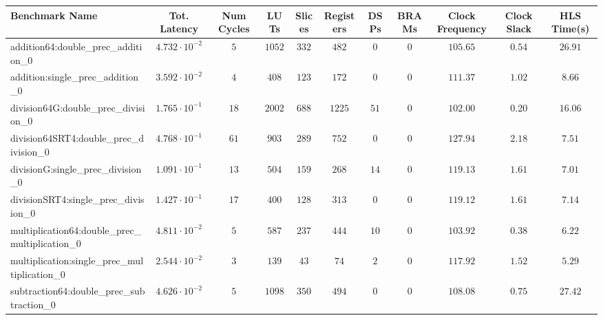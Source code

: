 \begin{tabular}{|l|c|c|c|c|c|c|c|c|c|c|}
\hline
Benchmark Name                                   & Tot. Latency            & Num Cycles & LUTs     & Slices   & Registers & DSPs   & BRAMs & Clock Frequency & Clock Slack & HLS Time(s) \\
\hline
addition64:double\_prec\_addition\_0             & $ 4.732 \cdot 10^{-2} $ & $ 5      $ & $ 1052 $ & $ 332  $ & $ 482   $ & $ 0  $ & $ 0 $ & $ 105.65      $ & $ 0.54    $ & $ 26.91   $ \\
addition:single\_prec\_addition\_0               & $ 3.592 \cdot 10^{-2} $ & $ 4      $ & $ 408  $ & $ 123  $ & $ 172   $ & $ 0  $ & $ 0 $ & $ 111.37      $ & $ 1.02    $ & $ 8.66    $ \\
division64G:double\_prec\_division\_0            & $ 1.765 \cdot 10^{-1} $ & $ 18     $ & $ 2002 $ & $ 688  $ & $ 1225  $ & $ 51 $ & $ 0 $ & $ 102.00      $ & $ 0.20    $ & $ 16.06   $ \\
division64SRT4:double\_prec\_division\_0         & $ 4.768 \cdot 10^{-1} $ & $ 61     $ & $ 903  $ & $ 289  $ & $ 752   $ & $ 0  $ & $ 0 $ & $ 127.94      $ & $ 2.18    $ & $ 7.51    $ \\
divisionG:single\_prec\_division\_0              & $ 1.091 \cdot 10^{-1} $ & $ 13     $ & $ 504  $ & $ 159  $ & $ 268   $ & $ 14 $ & $ 0 $ & $ 119.13      $ & $ 1.61    $ & $ 7.01    $ \\
divisionSRT4:single\_prec\_division\_0           & $ 1.427 \cdot 10^{-1} $ & $ 17     $ & $ 400  $ & $ 128  $ & $ 313   $ & $ 0  $ & $ 0 $ & $ 119.12      $ & $ 1.61    $ & $ 7.14    $ \\
multiplication64:double\_prec\_multiplication\_0 & $ 4.811 \cdot 10^{-2} $ & $ 5      $ & $ 587  $ & $ 237  $ & $ 444   $ & $ 10 $ & $ 0 $ & $ 103.92      $ & $ 0.38    $ & $ 6.22    $ \\
multiplication:single\_prec\_multiplication\_0   & $ 2.544 \cdot 10^{-2} $ & $ 3      $ & $ 139  $ & $ 43   $ & $ 74    $ & $ 2  $ & $ 0 $ & $ 117.92      $ & $ 1.52    $ & $ 5.29    $ \\
subtraction64:double\_prec\_subtraction\_0       & $ 4.626 \cdot 10^{-2} $ & $ 5      $ & $ 1098 $ & $ 350  $ & $ 494   $ & $ 0  $ & $ 0 $ & $ 108.08      $ & $ 0.75    $ & $ 27.42   $ \\

\end{tabular}
